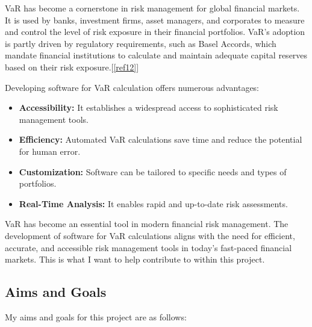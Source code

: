 \documentclass{article}
\begin{document}
VaR has become a cornerstone in risk management for global financial markets. It is used by banks, investment firms, asset managers, and corporates to measure and control the level of risk exposure in their financial portfolios. VaR's adoption is partly driven by regulatory requirements, such as Basel Accords, which mandate financial institutions to calculate and maintain adequate capital reserves based on their risk exposure.[\ref{ref12}]\\\vspace{0.3cm} 


Developing software for VaR calculation offers numerous advantages:
\begin{itemize}
    \item \textbf{Accessibility:} It establishes a widespread access to sophisticated risk management tools.
    \item \textbf{Efficiency:} Automated VaR calculations save time and reduce the potential for human error.
    \item \textbf{Customization:} Software can be tailored to specific needs and types of portfolios.
    \item \textbf{Real-Time Analysis:} It enables rapid and up-to-date risk assessments.
\end{itemize}

VaR has become an essential tool in modern financial risk management. The development of software for VaR calculations aligns with the need for efficient, accurate, and accessible risk management tools in today's fast-paced financial markets. This is what I want to help contribute to within this project.\\

\subsection{Aims and Goals}
My aims and goals for this project are as follows:
\end{document}
